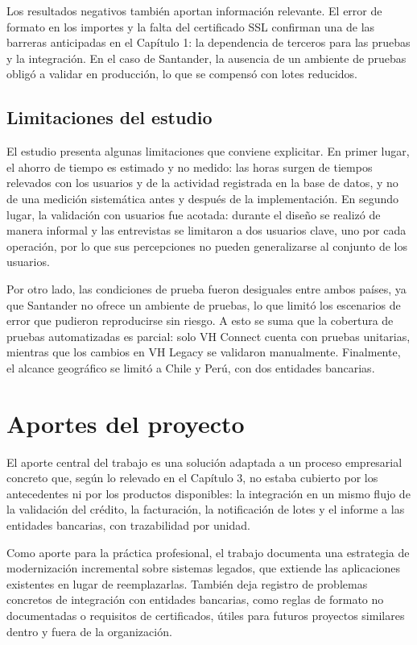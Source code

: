 Los resultados negativos también aportan información relevante. El error de formato en los importes y la falta del certificado SSL confirman una de las barreras anticipadas en el Capítulo 1: la dependencia de terceros para las pruebas y la integración. En el caso de Santander, la ausencia de un ambiente de pruebas obligó a validar en producción, lo que se compensó con lotes reducidos.

\subsection{Limitaciones del estudio}

El estudio presenta algunas limitaciones que conviene explicitar. En primer lugar, el ahorro de tiempo es estimado y no medido: las horas surgen de tiempos relevados con los usuarios y de la actividad registrada en la base de datos, y no de una medición sistemática antes y después de la implementación. En segundo lugar, la validación con usuarios fue acotada: durante el diseño se realizó de manera informal y las entrevistas se limitaron a dos usuarios clave, uno por cada operación, por lo que sus percepciones no pueden generalizarse al conjunto de los usuarios.

Por otro lado, las condiciones de prueba fueron desiguales entre ambos países, ya que Santander no ofrece un ambiente de pruebas, lo que limitó los escenarios de error que pudieron reproducirse sin riesgo. A esto se suma que la cobertura de pruebas automatizadas es parcial: solo VH Connect cuenta con pruebas unitarias, mientras que los cambios en VH Legacy se validaron manualmente. Finalmente, el alcance geográfico se limitó a Chile y Perú, con dos entidades bancarias.

\section{Aportes del proyecto}

El aporte central del trabajo es una solución adaptada a un proceso empresarial concreto que, según lo relevado en el Capítulo 3, no estaba cubierto por los antecedentes ni por los productos disponibles: la integración en un mismo flujo de la validación del crédito, la facturación, la notificación de lotes y el informe a las entidades bancarias, con trazabilidad por unidad.

Como aporte para la práctica profesional, el trabajo documenta una estrategia de modernización incremental sobre sistemas legados, que extiende las aplicaciones existentes en lugar de reemplazarlas. También deja registro de problemas concretos de integración con entidades bancarias, como reglas de formato no documentadas o requisitos de certificados, útiles para futuros proyectos similares dentro y fuera de la organización.

